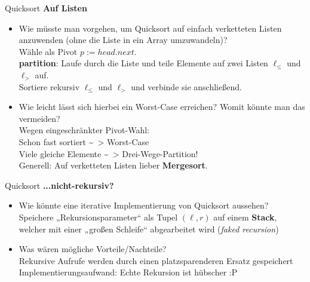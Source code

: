 \begin{frame}{Quicksort}
	\textbf{Auf Listen} \\
	\begin{itemize}
		\item Wie müsste man vorgehen, um Quicksort auf einfach verketteten Listen anzuwenden (ohne die Liste in ein Array umzuwandeln)? \\ 
		\pause
		\impl Wähle als Pivot $p := head.next$. \\ 
		\textbf{partition}: Laufe durch die Liste und teile Elemente auf zwei Listen $\ell_\leq$ und $\ell_>$ auf. \\
		Sortiere rekursiv $\ell_\leq$ und $\ell_>$ und verbinde sie anschließend.
		\item Wie leicht lässt sich hierbei ein Worst-Case erreichen? Womit könnte man das vermeiden? \\
		\pause
		\impl Wegen eingeschränkter Pivot-Wahl: \\
		Schon fast sortiert \~~> Worst-Case \\
		\impl Viele gleiche Elemente \~~> Drei-Wege-Partition! \\
		\impl Generell: Auf verketteten Listen lieber \textbf{Mergesort}.
	\end{itemize}
\end{frame}

\begin{frame}{Quicksort}
	\textbf{...nicht-rekursiv?} \\
	\begin{itemize}
		\item Wie könnte eine iterative Implementierung von Quicksort aussehen? \\
		\pause
		\impl Speichere „Rekursionsparameter“ als Tupel $(\ell, r)$ auf einem \textbf{Stack}, welcher mit einer „großen Schleife“ abgearbeitet wird (\emph{faked recursion})
		\item Was wären mögliche Vorteile/Nachteile? \\ 
		\pause
		\Pros Rekursive Aufrufe werden durch einen platzsparenderen Ersatz gespeichert \\
		\Cons Implementierungsaufwand: Echte Rekursion ist hübscher :P
	\end{itemize}
\end{frame}

